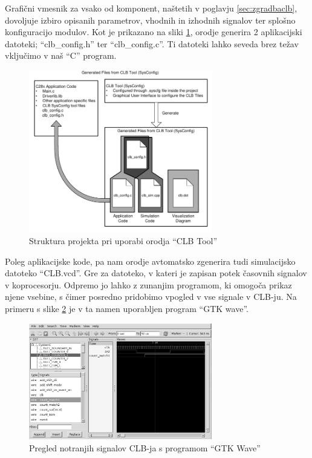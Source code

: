 \documentclass[a4paper]{article}
\begin{document}
\begin{sloppypar}
Grafični vmesnik za vsako od komponent, naštetih v poglavju
\ref{sec:zgradbaclb}, dovoljuje izbiro opisanih parametrov, vhodnih in izhodnih
signalov ter splošno konfiguracijo modulov. Kot je prikazano na sliki
\ref{fig:clbtool_struktura}, orodje generira 2 aplikacijski datoteki;
``clb\_config.h'' ter ``clb\_config.c''. Ti datoteki lahko seveda brez težav
vključimo v naš ``C'' program.

\begin{figure}[htb]
    \centerline{\includegraphics[width=8cm]{clbtool_struktura}}
    \caption{Struktura projekta pri uporabi orodja ``CLB Tool''
             \cite[Pogl.~1]{clb-user-guide}}
    \label{fig:clbtool_struktura} 
\end{figure} 

Poleg aplikacijske kode, pa nam orodje avtomatsko zgenerira tudi simulacijsko
datoteko ``CLB.vcd''. Gre za datoteko, v kateri je zapisan potek časovnih
signalov v koprocesorju. Odpremo jo lahko z zunanjim programom, ki omogoča
prikaz njene vsebine, s čimer posredno pridobimo vpogled v vse signale v
CLB-ju. Na primeru s slike \ref{fig:clbtool_simulacija} je v ta namen
uporabljen program ``GTK wave''.

\begin{figure}[htb]
    \centerline{\includegraphics[width=8cm]{gtkwave}}
    \caption{Pregled notranjih signalov CLB-ja s programom ``GTK Wave''}
    \label{fig:clbtool_simulacija} 
\end{figure} 


\end{sloppypar}
\end{document}
